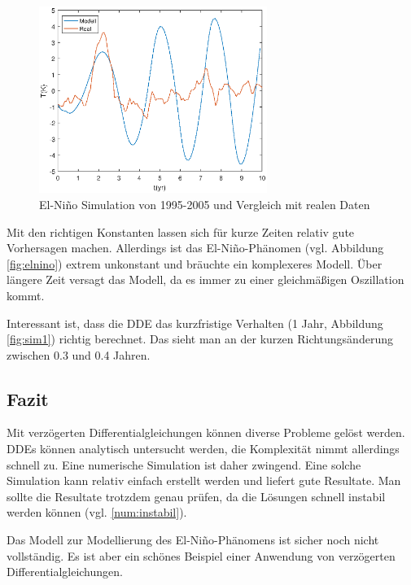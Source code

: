 \begin{figure}
	\centering
	\includegraphics[width=0.66\textwidth,height=0.33\textheight]{verzoegert/inp/figures/sim_10.eps}
	\caption{El-Niño Simulation von 1995-2005 und Vergleich mit realen Daten}
	\label{fig:sim10}
\end{figure}
Mit den richtigen Konstanten lassen sich für kurze Zeiten relativ gute Vorhersagen machen.
Allerdings ist das El-Niño-Phänomen (vgl. Abbildung \ref{fig:elnino}) extrem unkonstant und bräuchte ein komplexeres Modell.
Über längere Zeit versagt das Modell, da es immer zu einer gleichmäßigen Oszillation kommt.

Interessant ist, dass die DDE das kurzfristige Verhalten (1 Jahr, Abbildung \ref{fig:sim1}) richtig berechnet.
Das sieht man an der kurzen Richtungsänderung zwischen 0.3 und 0.4 Jahren.



\subsection{Fazit}
Mit verzögerten Differentialgleichungen können diverse Probleme gelöst werden.
DDEs können analytisch untersucht werden, die Komplexität nimmt allerdings schnell zu.
Eine numerische Simulation ist daher zwingend.
Eine solche Simulation kann relativ einfach erstellt werden und liefert gute Resultate.
Man sollte die Resultate trotzdem genau prüfen, da die Lösungen schnell instabil werden können (vgl. \ref{num:instabil}).

Das Modell zur Modellierung des El-Niño-Phänomens ist sicher noch nicht vollständig.
Es ist aber ein schönes Beispiel einer Anwendung von verzögerten Differentialgleichungen. 